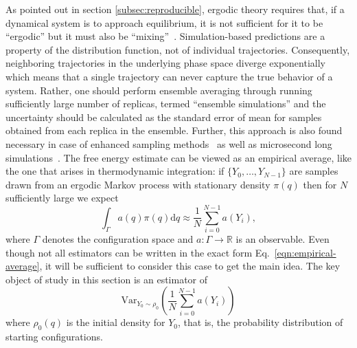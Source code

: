 As pointed out in section \ref{subsec:reproducible}, ergodic theory requires that, if a dynamical system is to approach equilibrium, it is not sufficient for it to be ``ergodic'' but it must also be ``mixing''~\cite{coveney2016, mdbook2025}. Simulation-based predictions are a property of the distribution function, not of individual trajectories. Consequently, neighboring trajectories in the underlying phase space diverge exponentially which means that a single trajectory can never capture the true behavior of a system. Rather, one should perform ensemble averaging through running sufficiently large number of replicas, termed ``ensemble simulations'' and the uncertainty should be calculated as the standard error of mean for samples obtained from each replica in the ensemble. Further, this approach is also found necessary in case of enhanced sampling methods~\cite{bhati2018} as well as microsecond long simulations~\cite{bhati2023}.
The free energy estimate can be viewed as an empirical average, like the one that arises in thermodynamic integration: if $\{Y_0, \dots, Y_{N-1}\}$ are samples drawn from an ergodic Markov process with stationary density $\pi(q)$ then for $N$ sufficiently large we expect
\begin{equation}
    \int_\Gamma a(q) \pi(q) \mathrm{d}q\approx \frac{1}{N}\sum_{i=0}^{N-1} a(Y_i), \label{eqn:empirical-average}
\end{equation}
where $\Gamma$ denotes the configuration space and $a : \Gamma \rightarrow \mathbb{R}$ is an observable. Even though not all estimators can be written in the exact form Eq.~\ref{eqn:empirical-average}, it will be sufficient to consider this case to get the main idea. The key object of study in this section is an estimator of
\begin{equation}
    \mathrm{Var}_{Y_0 \sim \rho_0}\left(\frac{1}{N}\sum_{i=0}^{N-1} a(Y_i)\right)
\end{equation}
where $\rho_0(q)$ is the initial density for $Y_0$, that is, the probability distribution of starting configurations.

